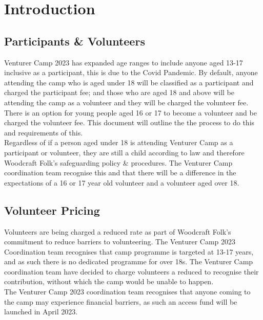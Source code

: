 \documentclass[a4paper, 11pt]{article}
\begin{document}
\section{Introduction}
\subsection{Participants \& Volunteers}
Venturer Camp 2023 has expanded age ranges to include anyone aged 13-17 inclusive as a participant, this is due to the Covid Pandemic. By default, anyone attending the camp who is aged under 18 will be classified as a participant and charged the participant fee; and those who are aged 18 and above will be attending the camp as a volunteer and they will be charged the volunteer fee.\\

There is an option for young people aged 16 or 17 to become a volunteer and be charged the volunteer fee. This document will outline the the process to do this and requirements of this.\\

Regardless of if a person aged under 18 is attending Venturer Camp as a participant or volunteer, they are still a child according to law and therefore Woodcraft Folk's safeguarding policy \& procedures. The Venturer Camp coordination team recognise this and that there will be a difference in the expectations of a 16 or 17 year old volunteer and a volunteer aged over 18. 

\subsection{Volunteer Pricing}
Volunteers are being charged a reduced rate as part of Woodcraft Folk's commitment to reduce barriers to volunteering. The Venturer Camp 2023 Coordination team recognises that camp programme is targeted at 13-17 years, and as such there is no dedicated programme for over 18s. The Venturer Camp coordination team have decided to charge volunteers a reduced to recognise their contribution, without which the camp would be unable to happen.\\

The Venturer Camp 2023 coordination team recognises that anyone coming to the camp may experience financial barriers, as such an access fund will be launched in April 2023. 
\end{document}
